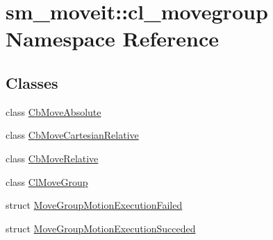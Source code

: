 \hypertarget{namespacesm__moveit_1_1cl__movegroup}{}\section{sm\+\_\+moveit\+:\+:cl\+\_\+movegroup Namespace Reference}
\label{namespacesm__moveit_1_1cl__movegroup}
\subsection*{Classes}
\begin{DoxyCompactItemize}
\item 
class \hyperlink{classsm__moveit_1_1cl__movegroup_1_1CbMoveAbsolute}{Cb\+Move\+Absolute}
\item 
class \hyperlink{classsm__moveit_1_1cl__movegroup_1_1CbMoveCartesianRelative}{Cb\+Move\+Cartesian\+Relative}
\item 
class \hyperlink{classsm__moveit_1_1cl__movegroup_1_1CbMoveRelative}{Cb\+Move\+Relative}
\item 
class \hyperlink{classsm__moveit_1_1cl__movegroup_1_1ClMoveGroup}{Cl\+Move\+Group}
\item 
struct \hyperlink{structsm__moveit_1_1cl__movegroup_1_1MoveGroupMotionExecutionFailed}{Move\+Group\+Motion\+Execution\+Failed}
\item 
struct \hyperlink{structsm__moveit_1_1cl__movegroup_1_1MoveGroupMotionExecutionSucceded}{Move\+Group\+Motion\+Execution\+Succeded}
\end{DoxyCompactItemize}
